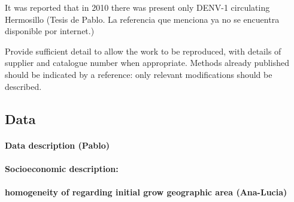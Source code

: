 It was reported that in 2010 there was present only DENV-1 circulating
Hermosillo (Tesis de Pablo. La referencia que menciona ya no se encuentra
disponible por internet.)

Provide sufficient detail to allow the work to be
reproduced, with details of supplier and catalogue
number when appropriate. Methods already published
should be indicated by a reference: only relevant
modifications should be described.
\subsection{Data}
    \paragraph{Data description (Pablo)}
    \paragraph{Socioeconomic description:}
    \paragraph{homogeneity of regarding initial grow
    geographic area (Ana-Lucia)}
